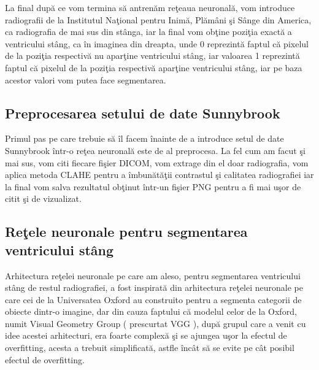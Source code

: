 \par

La final dup\u{a} ce vom termina s\u{a} antren\u{a}m re\c{t}eaua neuronal\u{a}, vom introduce radiografii de la Institutul Na\c{t}ional pentru Inim\u{a}, Pl\u{a}m\^{a}ni \c{s}i S\^{a}nge din America, ca radiografia de mai sus din st\^{a}nga, iar la final vom ob\c{t}ine pozi\c{t}ia exact\u{a} a ventricului st\^{a}ng, ca \^{i}n imaginea din dreapta, unde 0 reprezint\u{a} faptul c\u{a} pixelul de la pozi\c{t}ia respectiv\u{a} nu apar\c{t}ine ventricului st\^{a}ng, iar valoarea 1 reprezint\u{a} faptul c\u{a} pixelul de la pozi\c{t}ia respectiv\u{a} apar\c{t}ine ventricului st\^{a}ng, iar pe baza acestor valori vom putea face segmentarea.

\subsection{Preprocesarea setului de date Sunnybrook}

Primul pas pe care trebuie s\u{a} \^{i}l facem \^{i}nainte de a introduce setul de date Sunnybrook \^{i}ntr-o re\c{t}ea neuronal\u{a} este de al preprocesa. La fel cum am facut \c{s}i mai sus, vom citi fiecare fi\c{s}ier DICOM, vom extrage din el doar radiografia, vom aplica metoda CLAHE pentru a \^{i}mbun\u{a}t\u{a}\c{t}ii contrastul \c{s}i calitatea radiografiei iar la final vom salva rezultatul ob\c{t}inut \^{i}ntr-un fi\c{s}ier PNG pentru a fi mai u\c{s}or de citit \c{s}i de vizualizat.

\subsection{Re\c{t}ele neuronale pentru segmentarea ventricului st\^{a}ng}

Arhitectura re\c{t}elei neuronale pe care am aleso, pentru segmentarea ventricului st\^{a}ng de restul radiografiei, a fost inspirat\u{a} din arhitectura re\c{t}elei neuronale pe care cei de la Universatea Oxford au construito pentru a segmenta categorii de obiecte dintr-o imagine, dar din cauza faptului c\u{a} modelul celor de la Oxford, numit Visual Geometry Group ( prescurtat VGG ), dup\u{a} grupul care a venit cu idee acestei arhitecturi, era foarte complex\u{a} \c{s}i se ajungea u\c{s}or la efectul de overfitting, acesta a trebuit simplificat\u{a,} astfle \^{i}nc\^{a}t s\u{a} se evite pe c\^{a}t posibil efectul de overfitting.

\par

